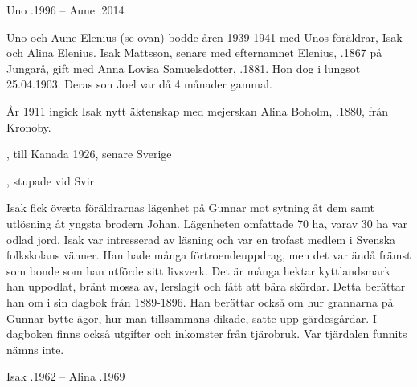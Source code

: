 Uno .1996  --  Aune .2014


Uno och Aune Elenius (se ovan) bodde åren 1939-1941 med Unos föräldrar, Isak och Alina Elenius. Isak Mattsson, senare med efternamnet Elenius, .1867 på Jungarå, gift med Anna Lovisa Samuelsdotter, .1881. Hon dog i lungsot 25.04.1903. Deras son Joel var då 4 månader gammal.

År 1911 ingick Isak nytt äktenskap med mejerskan Alina Boholm, .1880, från Kronoby.
\begin{jhchildren}
  \item {}, till Kanada 1926, senare Sverige
  \item {}
  \item {}
  \item {}
  \item {}, stupade vid Svir
  \item {}
\end{jhchildren}
Isak fick överta föräldrarnas lägenhet på Gunnar mot sytning åt dem samt utlösning åt yngsta brodern Johan. Lägenheten omfattade 70 ha, varav 30 ha var odlad jord. Isak var intresserad av läsning och var en trofast medlem i Svenska folkskolans vänner. Han hade många förtroendeuppdrag, men det var ändå främst som bonde som han utförde sitt livsverk. Det är många hektar kyttlandsmark han uppodlat, bränt mossa av, lerslagit och fått att bära skördar. Detta berättar han om i sin dagbok från 1889-1896. Han berättar också om  hur grannarna på Gunnar bytte ägor, hur man tillsammans dikade, satte upp gärdesgårdar. I dagboken finns också utgifter och inkomster från tjärobruk. Var tjärdalen funnits nämns	inte.

Isak .1962  --  Alina .1969


